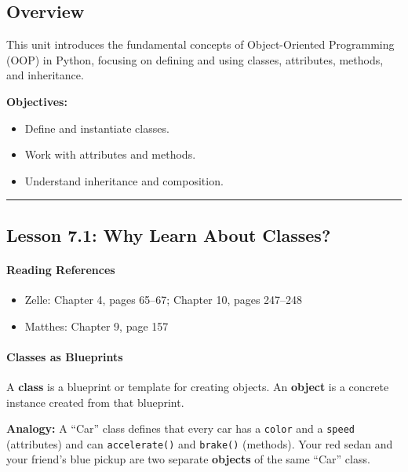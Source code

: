\documentclass[
  justified,
  openright,
]{tufte-book}
\let\subsubsection\paragraph
\let\paragraph\paragraph
\let\subsubsection\paragraph
\let\paragraph\paragraph
\providecommand{\tightlist}{%
  \setlength{\itemsep}{0pt}\setlength{\parskip}{0pt}}
\begin{document}
\subsection{Overview}\label{overview-7}

This unit introduces the fundamental concepts of Object-Oriented
Programming (OOP) in Python, focusing on defining and using classes,
attributes, methods, and inheritance.

\textbf{Objectives:}

\begin{itemize}
\tightlist
\item
  Define and instantiate classes.
\item
  Work with attributes and methods.
\item
  Understand inheritance and composition.
\end{itemize}

\begin{center}\rule{0.5\linewidth}{0.5pt}\end{center}

\subsection{Lesson 7.1: Why Learn About
Classes?}\label{lesson-7.1-why-learn-about-classes}

\subsubsection{Reading References}\label{reading-references-19}

\begin{itemize}
\tightlist
\item
  Zelle: Chapter 4, pages 65--67; Chapter 10, pages 247--248
\item
  Matthes: Chapter 9, page 157
\end{itemize}

\subsubsection{Classes as Blueprints}\label{classes-as-blueprints}

A \textbf{class} is a blueprint or template for creating objects. An
\textbf{object} is a concrete instance created from that blueprint.

\textbf{Analogy:} A ``Car'' class defines that every car has a
\texttt{color} and a \texttt{speed} (attributes) and can
\texttt{accelerate()} and \texttt{brake()} (methods). Your red sedan and
your friend's blue pickup are two separate \textbf{objects} of the same
``Car'' class.
\end{document}
